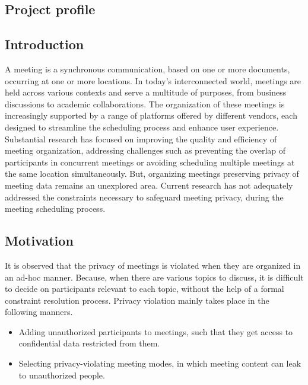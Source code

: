     \begin{spacing}{1.0}
    \newpage
    \section{Project profile} 
    \subsection{Introduction}
    \indent \par A meeting is a synchronous communication, based on one or more documents, occurring at one or more locations. In today's interconnected world, meetings are held across various contexts and serve a multitude of purposes, from business discussions to academic collaborations. The organization of these meetings is increasingly supported by a range of platforms offered by different vendors, each designed to streamline the scheduling process and enhance user experience. Substantial research has focused on improving the quality and efficiency of meeting organization, addressing challenges such as preventing the overlap of participants in concurrent meetings or avoiding scheduling multiple meetings at the same location simultaneously. But, organizing meetings preserving privacy of meeting data remains an unexplored area. Current research has not adequately addressed the constraints necessary to safeguard meeting privacy, during the meeting scheduling process.
    
    \subsection{Motivation}
    \indent \par It is observed that the privacy of meetings is violated when they are organized in an ad-hoc manner. Because, when there are various topics to discuss, it is difficult to decide on participants relevant to each topic, without the help of a formal constraint resolution process. Privacy violation mainly takes place in the following manners.
    \begin{itemize}
        \item Adding unauthorized participants to meetings, such that they get access to confidential data restricted from them.
        \item Selecting privacy-violating meeting modes, in which meeting content can leak to unauthorized people.
    \end{itemize}


\end{spacing}

